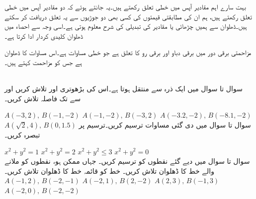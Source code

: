 بہت سارے اہم مقادیر  آپس میں خطی تعلق رکھتے ہیں۔یہ جانتے ہوئے کہ دو مقادیر آپس میں خطی تعلق رکھتے ہیں، ہم ان کی مطابقتی قیمتوں کی کسی بھی دو جوڑیوں سے یہ تعلق دریافت کر سکتے ہیں۔ڈھلوان سے ہمیں چڑھائی  یا مقادیر کی تبدیلی کی شرح معلوم ہوتی ہے۔اسی وجہ سے  احصاء میں ڈھلوان کلیدی کردار ادا کرتا ہے۔ 

مزاحمتی برقی دور میں برقی دباو  اور برقی رو  کا تعلق  ہے جو خطی مساوات ہے۔اس مساوات کا ڈھلوان  ہے جس کو مزاحمت کہتے ہیں۔

\\
سوال  تا سوال  میں ایک ذرہ  سے  منتقل ہوتا ہے۔اس کی بڑھوتری  اور  تلاش کریں اور  سے  تک فاصلہ تلاش کریں۔

$A(-3,2),\, B(-1,-2)$
$A(-1,-2),\, B(-3,2)$
$A(-3.2,-2),\, B(-8.1,-2)$
$A(\sqrt{2},4),\, B(0,1.5)$
سوال  تا سوال  میں دی گئی مساوات ترسیم کریں۔ترسیم پر تبصرہ کریں۔

$x^2+y^2=1$
$x^2+y^2=2$
$x^2+y^2\le 3$
$x^2+y^2=0$
\\
سوال  تا سوال  میں دیے گئے نقطوں کو ترسیم کریں۔ جہاں ممکن ہو، نقطوں کو ملانے والے خط کا  ڈھلوان تلاش کریں۔ خط  کو  قائمہ خط کا  ڈھلوان تلاش کریں۔\\

$A(-1,2),\,B(-2,-1)$
$A(-2,1),\,B(2,-2)$
$A(2,3),\,B(-1,3)$
$A(-2,0),\,B(-2,-2)$


